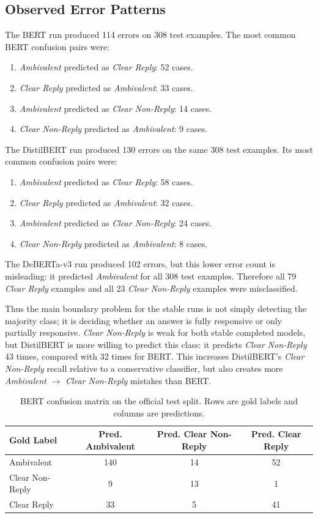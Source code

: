 \subsection{Observed Error Patterns}

The BERT run produced 114 errors on 308 test examples. The most common BERT confusion pairs were:
\begin{enumerate}
	\item \emph{Ambivalent} predicted as \emph{Clear Reply}: 52 cases.
	\item \emph{Clear Reply} predicted as \emph{Ambivalent}: 33 cases.
	\item \emph{Ambivalent} predicted as \emph{Clear Non-Reply}: 14 cases.
	\item \emph{Clear Non-Reply} predicted as \emph{Ambivalent}: 9 cases.
\end{enumerate}

The DistilBERT run produced 130 errors on the same 308 test examples. Its most common confusion pairs were:
\begin{enumerate}
	\item \emph{Ambivalent} predicted as \emph{Clear Reply}: 58 cases.
	\item \emph{Clear Reply} predicted as \emph{Ambivalent}: 32 cases.
	\item \emph{Ambivalent} predicted as \emph{Clear Non-Reply}: 24 cases.
	\item \emph{Clear Non-Reply} predicted as \emph{Ambivalent}: 8 cases.
\end{enumerate}

The DeBERTa-v3 run produced 102 errors, but this lower error count is misleading: it predicted \emph{Ambivalent} for all 308 test examples. Therefore all 79 \emph{Clear Reply} examples and all 23 \emph{Clear Non-Reply} examples were misclassified.

Thus the main boundary problem for the stable runs is not simply detecting the majority class; it is deciding whether an answer is fully responsive or only partially responsive. \emph{Clear Non-Reply} is weak for both stable completed models, but DistilBERT is more willing to predict this class: it predicts \emph{Clear Non-Reply} 43 times, compared with 32 times for BERT. This increases DistilBERT's \emph{Clear Non-Reply} recall relative to a conservative classifier, but also creates more \emph{Ambivalent} $\to$ \emph{Clear Non-Reply} mistakes than BERT.

\begin{table}[h]
\centering
\small
\begin{tabular}{lccc}
\toprule
Gold Label & Pred. Ambivalent & Pred. Clear Non-Reply & Pred. Clear Reply \\
\midrule
Ambivalent & 140 & 14 & 52 \\
Clear Non-Reply & 9 & 13 & 1 \\
Clear Reply & 33 & 5 & 41 \\
\bottomrule
\end{tabular}
\caption{BERT confusion matrix on the official test split. Rows are gold labels and columns are predictions.}
\label{tab:bert-confusion}
\end{table}

